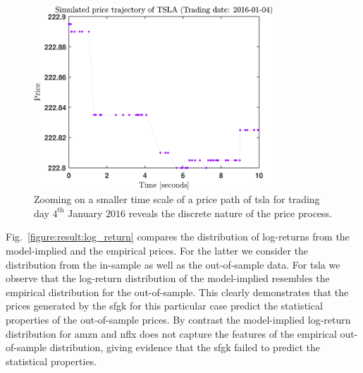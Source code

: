 \documentclass[11pt, a4paper]{thesis}  %
\begin{document}

\begin{figure} [H]
	\centering
	\includegraphics[width=0.8\textwidth]
	{./SignaturePlot/TSLA/20160104/price_simulated_micro_structure.pdf}
	\caption{Zooming on a smaller time scale of a price path of \ac{tsla} for trading day 
	$4^\textrm{th}$ January $2016$ reveals the discrete nature of the price process.}
	\label{figure:result:micro_price_evolution:tsla}	
\end{figure}	


Fig.~\ref{figure:result:log_return} compares the distribution of log-returns from the model-implied and the empirical prices. For the latter we consider the distribution from the in-sample as well as the out-of-sample data. For \ac{tsla} we observe that the log-return distribution of the model-implied resembles the empirical distribution for the out-of-sample. This clearly demonstrates that the prices generated by the \ac{sfgk} for this particular case predict the statistical properties of  the out-of-sample prices. By contrast the model-implied log-return distribution for \ac{amzn} and \ac{nflx} does not capture the features of the empirical out-of-sample distribution, giving evidence that the \ac{sfgk} failed to predict the statistical properties.

\end{document}
